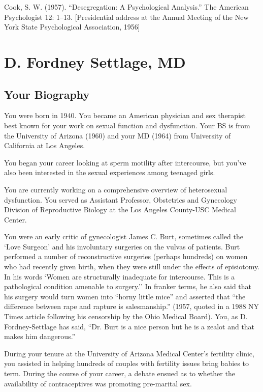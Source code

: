 Cook, S. W. (1957). ``Desegregation: A Psychological Analysis.'' The American Psychologist 12: 1--13. [Presidential address at the Annual Meeting of the New York State Psychological Association, 1956]

\chapter{D. Fordney Settlage, MD}
\label{d.fordneysettlagemd}

\section{Your Biography}
\label{yourbiography}

You were born in 1940. You became an American physician and sex therapist best known for your work on sexual function and dysfunction. Your BS is from the University of Arizona (1960) and your MD (1964) from University of California at Los Angeles.

You began your career looking at sperm motility after intercourse, but you've also been interested in the sexual experiences among teenaged girls.

You are currently working on a comprehensive overview of heterosexual dysfunction. You served as Assistant Professor, Obstetrics and Gynecology Division of Reproductive Biology at the Los Angeles County-USC Medical Center.

You were an early critic of gynecologist James C. Burt, sometimes called the `Love Surgeon' and his involuntary surgeries on the vulvas of patients. Burt performed a number of reconstructive surgeries (perhaps hundreds) on women who had recently given birth, when they were still under the effects of episiotomy. In his words `Women are structurally inadequate for intercourse. This is a pathological condition amenable to surgery.'' In franker terms, he also said that his surgery would turn women into ``horny little mice'' and asserted that ``the difference between rape and rapture is salesmanship.'' (1957, quoted in a 1988 NY Times article following his censorship by the Ohio Medical Board). You, as D. Fordney-Settlage has said, ``Dr. Burt is a nice person but he is a zealot and that makes him dangerous.''

During your tenure at the University of Arizona Medical Center's fertility clinic, you assisted in helping hundreds of couples with fertility issues bring babies to term. During the course of your career, a debate ensued as to whether the availability of contraceptives was promoting pre-marital sex.


